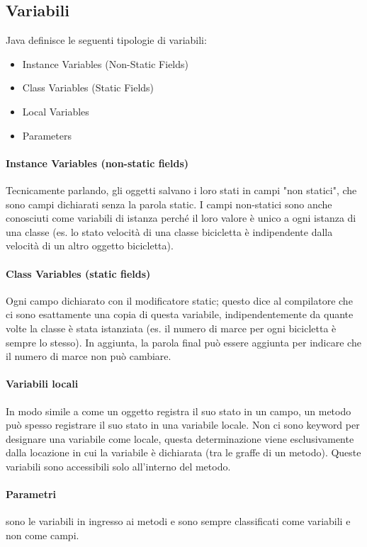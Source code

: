 \documentclass[a4paper,12pt,twoside]{book}
\begin{document}
\subsection{Variabili}
\label{subsec:variables}

Java definisce le seguenti tipologie di variabili:
\begin{itemize}
\item Instance Variables (Non-Static Fields)
\item Class Variables (Static Fields)
\item Local Variables
\item Parameters
\end{itemize}

\paragraph{Instance Variables (non-static fields)} Tecnicamente
parlando, gli oggetti salvano i loro stati in campi "non statici", che
sono campi dichiarati senza la parola static. I campi non-statici sono
anche conosciuti come variabili di istanza perché il loro valore è
unico a ogni istanza di una classe (es. lo stato velocità di una
classe bicicletta è indipendente dalla velocità di un altro oggetto
bicicletta).

\paragraph{Class Variables (static fields)} Ogni campo dichiarato
con il modificatore static; questo dice al compilatore che ci sono
esattamente una copia di questa variabile, indipendentemente da quante
volte la classe è stata istanziata (es. il numero di marce per ogni
bicicletta è sempre lo stesso). In aggiunta, la parola final può
essere aggiunta per indicare che il numero di marce non può cambiare.

\paragraph{Variabili locali} In modo simile a come un oggetto registra
il suo stato in un campo, un metodo può spesso registrare il suo stato
in una variabile locale. Non ci sono keyword per designare una
variabile come locale, questa determinazione viene esclusivamente
dalla locazione in cui la variabile è dichiarata (tra le graffe di un
metodo). Queste variabili sono accessibili solo all'interno del
metodo.

\paragraph{Parametri} sono le variabili in ingresso ai metodi e sono
sempre classificati come variabili e non come campi.
\end{document}
